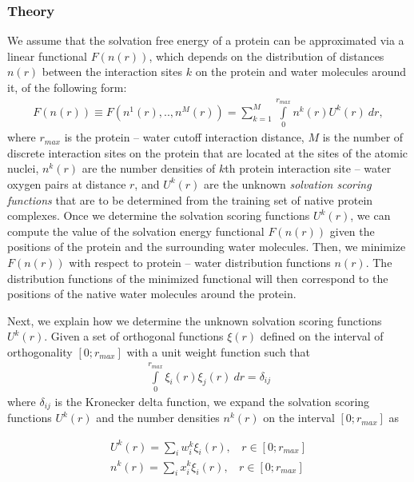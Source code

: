 \subsubsection{Theory}

We assume that the solvation free energy of a protein can be approximated via a linear functional $F(n(r))$, which depends on  the distribution of distances $n(r)$ between the interaction sites $k$ on the protein and water molecules around it,
of the following form:
\begin{eqnarray}
\label{eq:functional}
F(n(r))\equiv F(n^{1}(r),..,n^{M}(r)) = \sum_{k=1}^M  \int \limits_{0}^{r_{max}} n^{k}(r)U^{k}(r)~dr, 
\label{eq:solvationFun}
\end{eqnarray}
where $r_{max}$ is the protein -- water cutoff interaction distance, $M$ is the number of discrete interaction sites on the protein that are located at the sites of the atomic nuclei, $n^{k}(r)$ are  the number densities of $k$th protein interaction site -- water oxygen pairs at distance $r$, and $U^{k}(r)$ are the unknown  \emph{solvation scoring functions}  that are to be determined from the training set of native protein complexes. 
Once we determine the solvation scoring functions $U^{k}(r)$, we can compute the value of the solvation energy functional $F(n(r))$ given the positions of the protein and the surrounding water molecules.
%
Then, we minimize  $F(n(r))$ with respect to protein -- water distribution functions $n(r)$. The  distribution functions of the minimized functional
will then correspond to the positions of the native water molecules around the protein.

Next, we explain how we determine the unknown solvation scoring functions $U^{k}(r)$. Given a set of orthogonal functions $\xi (r)$ defined on the interval of orthogonality $[0;r_{max}]$ with a unit weight function such that
\begin{eqnarray}
\int \limits_{0}^{r_{max}} \xi_{i}(r) \xi_{j}(r)~dr = \delta_{i j}
\label{eq:orth}
\end{eqnarray}
where $\delta_{i j}$ is the Kronecker delta function, we expand the solvation scoring functions $U^{k}(r)$ and the number densities $n^{k}(r)$ on the interval $[0;r_{max}]$ as

\begin{eqnarray}
\label{eq:expU}
U^{k}(r)=\sum_i w_i^{k} \xi_i (r) ,~~~~r \in[0;r_{max}] \\
n^{k}(r)=\sum_i x_i^{k} \xi_i (r) ,~~~~r \in[0;r_{max}]
\label{eq:expg}
\end{eqnarray}

